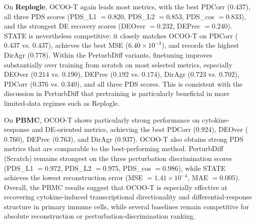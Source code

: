 \documentclass[11pt]{article}
\begin{document}
On \textbf{Replogle}, OCOO-T again leads most metrics, with the best PDCorr ($0.437$), all three PDS scores (PDS\_L1 $=0.820$, PDS\_L2 $=0.853$, PDS\_cos $=0.833$), and the strongest DE recovery scores (DEOver $=0.232$, DEPrec $=0.240$). STATE is nevertheless competitive: it closely matches OCOO-T on PDCorr ($0.437$ vs. $0.437$), achieves the best MSE ($6.40\times 10^{-3}$), and records the highest DirAgr ($0.778$). Within the PerturbDiff variants, finetuning improves substantially over training from scratch on most selected metrics, especially DEOver ($0.214$ vs. $0.190$), DEPrec ($0.192$ vs. $0.174$), DirAgr ($0.723$ vs. $0.702$), PDCorr ($0.376$ vs. $0.340$), and all three PDS scores. This is consistent with the discussion in PerturbDiff that pretraining is particularly beneficial in more limited-data regimes such as Replogle.

On \textbf{PBMC}, OCOO-T shows particularly strong performance on cytokine-response and DE-oriented metrics, achieving the best PDCorr ($0.924$), DEOver ($0.760$), DEPrec ($0.763$), and DirAgr ($0.937$). OCOO-T also obtains strong PDS metrics that are comparable to the best-performing method. PerturbDiff (Scratch) remains strongest on the three perturbation discrimination scores (PDS\_L1 $=0.972$, PDS\_L2 $=0.975$, PDS\_cos $=0.986$), while STATE achieves the lowest reconstruction error (MSE $=1.41\times 10^{-4}$, MAE $=0.005$). Overall, the PBMC results suggest that OCOO-T is especially effective at recovering cytokine-induced transcriptional directionality and differential-response structure in primary immune cells, while several baselines remain competitive for absolute reconstruction or perturbation-discrimination ranking.
\end{document}
